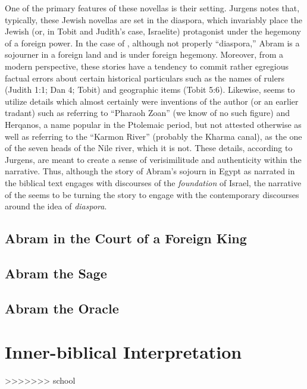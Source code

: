  One of the primary features of these novellas is their setting. Jurgens notes that, typically, these Jewish novellas are set in the diaspora, which invariably place the Jewish (or, in Tobit and Judith's case, Israelite) protagonist under the hegemony of a foreign power. In the case of \ga, although not properly ``diaspora,'' Abram is a sojourner in a foreign land and is under foreign hegemony. Moreover, from a modern perspective, these stories have a tendency to commit rather egregious factual errors about certain historical particulars such as the names of rulers (Judith 1:1; Dan 4; Tobit) and geographic items (Tobit 5:6). Likewise, \ga seems to utilize details which almost certainly were inventions of the author (or an earlier tradant) such as referring to ``Pharaoh Zoan'' (we know of no such figure) and Herqanos, a name popular in the Ptolemaic period, but not attested otherwise as well as referring to the ``Karmon River'' (probably the Kharma canal), as the one of the seven heads of the Nile river, which it is not.\autocites[7]{jurgens_jsj2018}[See also][50--59]{machiela_as2010}[197--199]{fitzmyer2004} These details, according to Jurgens, are meant to create a sense of verisimilitude and authenticity within the narrative. Thus, although the story of Abram's sojourn in Egypt as narrated in the biblical text engages with discourses of the \emph{foundation} of Israel, the narrative of the \ga seems to be turning the story to engage with the contemporary discourses around the idea of \emph{diaspora}.


 \subsection{Abram in the Court of a Foreign King}
 \subsection{Abram the Sage}
 \subsection{Abram the Oracle}
 \section{Inner-biblical Interpretation}
>>>>>>> school
